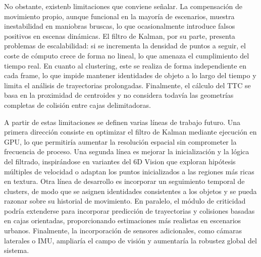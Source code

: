 No obstante, existenb limitaciones que conviene señalar. La compensación de
movimiento propio, aunque funcional en la mayoría de escenarios, muestra inestabilidad
en maniobras bruscas, lo que ocasionalmente introduce falsos positivos en
escenas dinámicas. El filtro de Kalman, por su parte, presenta problemas de
escalabilidad: si se incrementa la densidad de puntos a seguir, el coste de
cómputo crece de forma no lineal, lo que amenaza el cumplimiento del tiempo
real. En cuanto al clustering, este se realiza de forma independiente en cada
frame, lo que impide mantener identidades de objeto a lo largo del tiempo y
limita el análisis de trayectorias prolongadas. Finalmente, el cálculo del TTC
se basa en la proximidad de centroides y no considera todavía las geometrías
completas de colisión entre cajas delimitadoras.

A partir de estas limitaciones se definen varias líneas de trabajo futuro. Una
primera dirección consiste en optimizar el filtro de Kalman mediante ejecución
en GPU, lo que permitiría aumentar la resolución espacial sin comprometer la
frecuencia de proceso. Una segunda línea es mejorar la inicialización y la
lógica del filtrado, inspirándose en variantes del 6D Vision que exploran
hipótesis múltiples de velocidad o adaptan los puntos inicializados a las
regiones más ricas en textura. Otra línea de desarrollo es incorporar un
seguimiento temporal de clusters, de modo que se asignen identidades
consistentes a los objetos y se pueda razonar sobre su historial de movimiento.
En paralelo, el módulo de criticidad podría extenderse para incorporar
predicción de trayectorias y colisiones basadas en cajas orientadas,
proporcionando estimaciones más realistas en escenarios urbanos. Finalmente, la
incorporación de sensores adicionales, como cámaras laterales o IMU, ampliaría
el campo de visión y aumentaría la robustez global del sistema.


